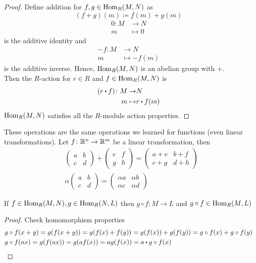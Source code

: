 \documentclass[../Main.tex]{subfiles}
\begin{document}
\begin{proof}
	Define addition for $f,g\in \operatorname{Hom}_R(M,N)$ as
	\[(f+g)(m)\coloneqq f(m)+g(m)\]
	\Exr
	\begin{align*}
	0\colon M&\to N\\
	m&\mapsto 0
	\end{align*}
	is the additive identity and
	\begin{align*}
	-f\colon M&\to N\\
	m&\mapsto -f(m)
	\end{align*}
	is the additive inverse. Hence, $\operatorname{Hom}_R(M,N)$ is an abelian group with $+$.\\
	Then the $R$-action for $r\in R$ and $f\in \operatorname{Hom}_R(M,N)$ is
	\begin{align*}
	(r\rdot f)\colon M \to& N\\
	m\mapsto& r\rdot f(m)
	\end{align*}
	\Exr $\operatorname{Hom}_R(M,N)$ satisfies all the $R$-module action properties.
\end{proof}
\Note These operations are the same operations we learned for functions (even linear transformations). Let $f\colon \mathbb{R}^n \to \mathbb{R}^m$ be a linear transformation, then
\begin{align*}
&\begin{pmatrix}
a&b\\
c&d
\end{pmatrix} + \begin{pmatrix}
e&f\\
g&h
\end{pmatrix} = \begin{pmatrix}
a+e&b+f\\
c+g&d+h
\end{pmatrix}\\
&\alpha \begin{pmatrix}
a&b\\
c&d
\end{pmatrix} = \begin{pmatrix}
\alpha a&\alpha b\\
\alpha c&\alpha d
\end{pmatrix}
\end{align*}
\begin{prop}
	If $f\in \operatorname{Hom}_R(M,N), g \in \operatorname{Hom}_R(N,L)$ then $g\circ f \colon M\to L$ and $g\circ f \in \operatorname{Hom}_R(M,L)$
\end{prop}
\begin{proof}
	Check homomorphism properties
	\begin{align*}
	&g\circ f(x+y) = g(f(x+y)) = g(f(x)+f(y)) = g(f(x)) +g(f(y)) =g\circ f(x) + g\circ f(y)\\
	&g\circ f(ax) = g(f(ax)) = g(af(x)) = ag(f(x))=a\rdot g\circ f(x) \qedhere
	\end{align*}
\end{proof}
\end{document}
